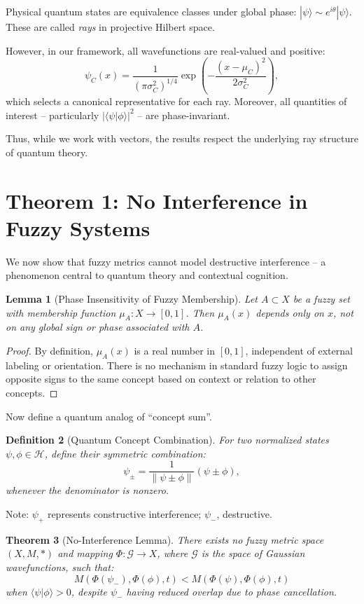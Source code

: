 \documentclass{article}
\newtheorem{theorem}{Theorem}
\newtheorem{lemma}[theorem]{Lemma}
\newtheorem{definition}[theorem]{Definition}
\begin{document}
Physical quantum states are equivalence classes under global phase: $ |\psi\rangle \sim e^{i\theta}|\psi\rangle $. These are called \emph{rays} in projective Hilbert space.

However, in our framework, all wavefunctions are real-valued and positive:
$$
\psi_C(x) = \frac{1}{(\pi \sigma_C^2)^{1/4}} \exp\left(-\frac{(x - \mu_C)^2}{2\sigma_C^2}\right),
$$
which selects a canonical representative for each ray. Moreover, all quantities of interest -- particularly $ |\langle\psi|\phi\rangle|^2 $ -- are phase-invariant.

Thus, while we work with vectors, the results respect the underlying ray structure of quantum theory.

\section{Theorem 1: No Interference in Fuzzy Systems}

We now show that fuzzy metrics cannot model destructive interference -- a phenomenon central to quantum theory and contextual cognition.

\begin{lemma}[Phase Insensitivity of Fuzzy Membership]
Let $A \subset X$ be a fuzzy set with membership function $\mu_A: X \to [0,1]$. Then $\mu_A(x)$ depends only on $x$, not on any global sign or phase associated with $A$.
\end{lemma}

\begin{proof}
By definition, $\mu_A(x)$ is a real number in $[0,1]$, independent of external labeling or orientation. There is no mechanism in standard fuzzy logic to assign opposite signs to the same concept based on context or relation to other concepts.
\end{proof}

Now define a quantum analog of ``concept sum''.

\begin{definition}[Quantum Concept Combination]
For two normalized states $\psi,\phi \in \mathcal{H}$, define their symmetric combination:
$$
\psi_{\pm} = \frac{1}{\|\psi \pm \phi\|} (\psi \pm \phi),
$$
whenever the denominator is nonzero.
\end{definition}

Note: $\psi_+$ represents constructive interference; $\psi_-$, destructive.

\begin{theorem}[No-Interference Lemma]
There exists no fuzzy metric space $(X,M,*)$ and mapping $\Phi: \mathcal{G} \to X$, where $\mathcal{G}$ is the space of Gaussian wavefunctions, such that:
$$
M(\Phi(\psi_-), \Phi(\phi), t) < M(\Phi(\psi), \Phi(\phi), t)
$$
when $\langle \psi | \phi \rangle > 0$, despite $\psi_-$ having reduced overlap due to phase cancellation.
\end{theorem}
\end{document}
